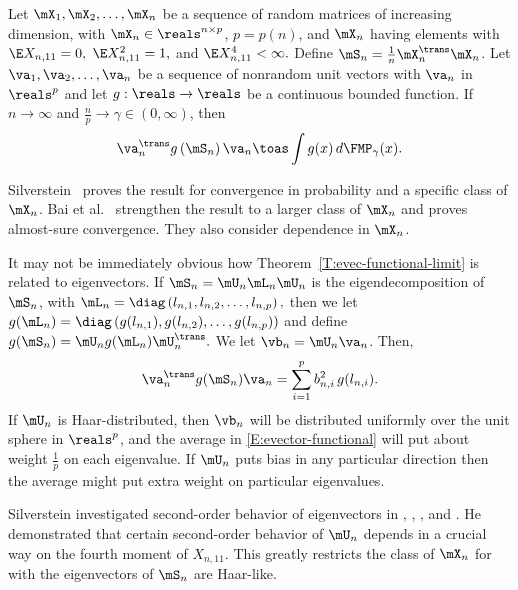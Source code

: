 \begin{theorem}\label{T:evec-functional-limit}
    Let $\mX_1, \mX_2, \ldots, \mX_n$ be a sequence of random matrices of
    increasing dimension, with $\mX_n \in \reals^{n \times p}$, $p = p(n)$,
    and $\mX_n$ having \iid elements with 
    \(
        \E X_{n,11} = 0,
    \)
    \(
        \E X_{n,11}^2 = 1,
    \)
    and
    \(
        \E X_{n,11}^4 < \infty.
    \)
    Define $\mS_n = \frac{1}{n} \mX_n^\trans \mX_n$.  Let
    $\va_1, \va_2, \ldots, \va_n$ be a sequence of nonrandom unit vectors with 
    $\va_n$ in $\reals^p$ and let $g : \reals \to \reals$ be a continuous 
    bounded function.  If $n \to \infty$ and
    $\frac{n}{p} \to \gamma \in (0,\infty)$, then
    \[
        \va_n^\trans g\left( \mS_n \right) \va_n
        \toas
        \int
            g(x)
            \,
            d\FMP_\gamma(x).
    \]
\end{theorem}

\noindent
Silverstein~\cite{silverstein1979reg} proves the result for convergence in probability and a specific class of $\mX_n$.  Bai et al.~\cite{bai2007ael} strengthen the result to a larger class of $\mX_n$ and proves almost-sure convergence.  They also consider dependence in $\mX_n$.

It may not be immediately obvious how Theorem~\ref{T:evec-functional-limit}
is related to eigenvectors.  If $\mS_n = \mU_n \mL_n \mU_n$ is the
eigendecomposition of $\mS_n$, with 
\(
    \mL_n
    = 
    \diag\left(
        l_{n,1}, l_{n,2}, \ldots, l_{n,p}
    \right),
\)
then we let 
\(
    g(\mL_n)
    =
    \diag \left(
        g(l_{n,1}), g(l_{n,2}), \ldots, g(l_{n,p})
    \right)
\)
and define
\(
    g(\mS_n)
    =
    \mU_n
    g(\mL_n)
    \mU_n^\trans.
\)
We let $\vb_n = \mU_n \va_n$.  Then,
\begin{equation}\label{E:evector-functional}
    \va_n^\trans g(\mS_n) \va_n
    =
    \sum_{i=1}^p
        b_{n,i}^2
        \,
        g( l_{n,i} ).
\end{equation}
If $\mU_n$ is Haar-distributed, then $\vb_n$ will be distributed uniformly over the unit sphere in $\reals^p$, and the average in \eqref{E:evector-functional} will put about weight $\frac{1}{p}$ on each eigenvalue.  If $\mU_n$ puts bias in any particular direction then the average might put extra weight on particular eigenvalues.

Silverstein investigated second-order behavior of eigenvectors in \cite{silverstein1981dbe}, \cite{silverstein1984slt}, \cite{silverstein1989eld}, and \cite{silverstein1990wcr}.  He demonstrated that certain second-order behavior of $\mU_n$ depends in a crucial way on the fourth moment of $X_{n,11}$.  This greatly restricts the class of $\mX_n$ for with the eigenvectors of $\mS_n$ are Haar-like.

